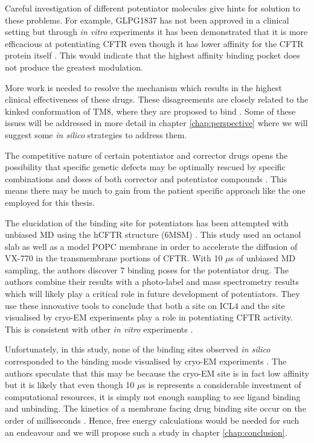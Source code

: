 Careful investigation of different potentiator molecules give hints for solution to these problems. For example, GLPG1837 has not been approved in a clinical setting but through \textit {in vitro} experiments it has been demonstrated that it is more efficacious at potentiating CFTR even though it has lower affinity for the CFTR protein itself \cite{vanderplas2018}. This would indicate that the highest affinity binding pocket does not produce the greatest modulation. 

More work is needed to resolve the mechanism which results in the highest clinical effectiveness of these drugs. These disagreements are closely related to the kinked conformation of TM8, where they are proposed to bind \cite{liu2019, yeh2019}. Some of these issues will be addressed in more detail in chapter \ref{chap:perspective} where we will suggest some \textit{in silico} strategies to address them. 

The competitive nature of certain potentiator and corrector drugs opens the possibility that specific genetic defects may be optimally rescued by specific combinations and doses of both corrector and potentiator compounds \cite{csanady2019}. This means there may be much to gain from the patient specific approach like the one employed for this thesis. 

The elucidation of the binding site for potentiators has been attempted with unbiased MD using the hCFTR structure (6MSM) \cite{laselva2021}. This study used an octanol slab as well as a model POPC membrane in order to accelerate the diffusion of VX-770 in the transmembrane portions of CFTR. With 10 $\mu$s of unbiased MD sampling, the authors discover 7 binding poses for the potentiator drug. The authors combine their results with a photo-label and mass spectrometry results which will likely play a critical role in future development of potentiators. They use these innovative tools to conclude that both a site on ICL4 and the site visualised by cryo-EM experiments play a role in potentiating CFTR activity. This is consistent with other \textit{in vitro} experiments \cite{csanady2019}.

Unfortunately, in this study, none of the binding sites observed \textit{in silico} corresponded to the binding mode visualised by cryo-EM experiments \cite{liu2019}. The authors speculate that this may be because the cryo-EM site is in fact low affinity but it is likely that even though 10 $\mu$s is represents a considerable investment of computational resources, it is simply not enough sampling to see ligand binding and unbinding. The kinetics of a membrane facing drug binding site occur on the order of milliseconds \cite{weikl2016}. Hence, free energy calculations would be needed for such an endeavour and we will propose such a study in chapter \ref{chap:conclusion}. 

